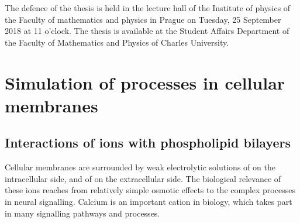 \documentclass[12pt,a4paper,twoside,openright]{report}
\begin{document}
The defence of the thesis is held 
in the lecture hall of the Institute of physics 
of the Faculty of mathematics and physics in Prague
on Tuesday, 25 September 2018 at 11 o'clock. 
The thesis is available at the Student Affairs Department of the Faculty of
Mathematics and Physics of Charles University. 


\newpage



\tableofcontents



\newpage











\chapter*{Simulation of processes in cellular membranes}



\section*{Interactions of ions with phospholipid bilayers}

Cellular membranes are surrounded by 
weak electrolytic solutions of  on the intracellular side, 
and of  on the extracellular side. 
The biological relevance of these ions reaches from relatively simple osmotic effects to the complex processes in neural signalling. \citep{Knudsen_book2002} 
Calcium is an important cation in biology, 
which takes part in many signalling pathways and processes. 
\end{document}
